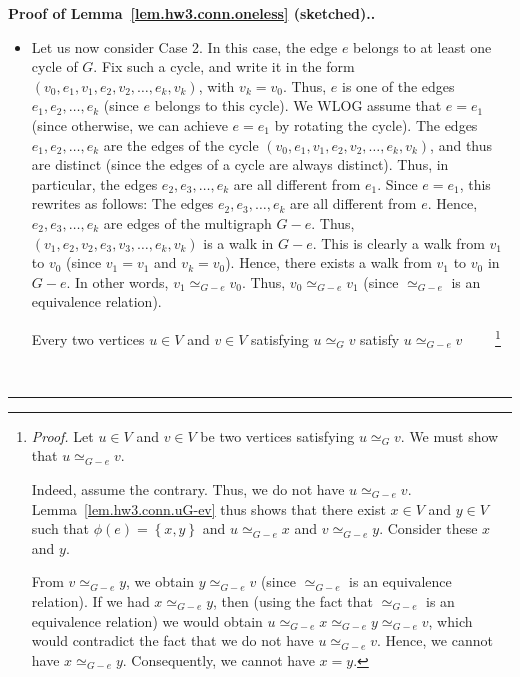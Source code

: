 \documentclass[numbers=enddot,12pt,final,onecolumn,notitlepage]{scrartcl}%
\theoremstyle{definition}
\newenvironment{proof}[1][Proof]{\noindent\textbf{#1.} }{\ \rule{0.5em}{0.5em}}
\newcommand{\set}[1]{\left\{ #1 \right\}}
\newcommand{\tup}[1]{\left( #1 \right)}
\begin{document}
\begin{proof}[Proof of Lemma~\ref{lem.hw3.conn.oneless} (sketched).]
\begin{itemize}
\item Let us now consider Case 2.
      In this case, the edge $e$ belongs to at least one cycle of
      $G$.
      Fix such a cycle, and write it in the form
      $\tup{v_0, e_1, v_1, e_2, v_2, \ldots, e_k, v_k}$, with
      $v_k = v_0$.
      Thus, $e$ is one of the edges $e_1, e_2, \ldots, e_k$ (since
      $e$ belongs to this cycle).
      We WLOG assume that $e = e_1$ (since otherwise, we can
      achieve $e = e_1$ by rotating the cycle).
      The edges $e_1, e_2, \ldots, e_k$ are the edges of the cycle
      $\tup{v_0, e_1, v_1, e_2, v_2, \ldots, e_k, v_k}$, and thus
      are distinct (since the edges of a cycle are always distinct).
      Thus, in particular, the edges $e_2, e_3, \ldots, e_k$ are
      all different from $e_1$. Since $e = e_1$, this rewrites as
      follows:
      The edges $e_2, e_3, \ldots, e_k$ are all different from $e$.
      Hence, $e_2, e_3, \ldots, e_k$ are edges of the multigraph
      $G - e$.
      Thus, $\tup{v_1, e_2, v_2, e_3, v_3, \ldots, e_k, v_k}$ is
      a walk in $G - e$.
      This is clearly a walk from $v_1$ to $v_0$ (since $v_1 = v_1$
      and $v_k = v_0$).
      Hence, there exists a walk from $v_1$ to $v_0$ in $G - e$.
      In other words, $v_1 \simeq_{G - e} v_0$.
      Thus, $v_0 \simeq_{G - e} v_1$ (since $\simeq_{G - e}$ is an
      equivalence relation).
      \par
      Every two vertices $u \in V$ and $v \in V$ satisfying
      $u \simeq_G v$ satisfy $u \simeq_{G - e} v$
      \ \ \ \ \footnote{\textit{Proof.} Let $u \in V$ and $v \in V$
        be two vertices satisfying $u \simeq_G v$.
        We must show that $u \simeq_{G - e} v$. \par
        Indeed, assume the contrary.
        Thus, we do not have $u \simeq_{G - e} v$.
        Lemma~\ref{lem.hw3.conn.uG-ev} thus shows that
        there exist $x \in V$ and $y \in V$ such that
        $\phi\tup{e} = \set{x, y}$ and $u \simeq_{G - e} x$ and
        $v \simeq_{G - e} y$.
        Consider these $x$ and $y$.
        \par From $v \simeq_{G - e} y$, we obtain
        $y \simeq_{G - e} v$ (since $\simeq_{G - e}$ is an
        equivalence relation).
        If we had $x \simeq_{G - e} y$, then (using the fact
        that $\simeq_{G - e}$ is an equivalence relation) we would
        obtain $u \simeq_{G - e} x \simeq_{G - e} y
        \simeq_{G - e} v$, which would contradict the fact that
        we do not have $u \simeq_{G - e} v$.
        Hence, we cannot have $x \simeq_{G - e} y$.
        Consequently, we cannot have $x = y$.
}
\end{itemize}
\end{proof}
\end{document}
